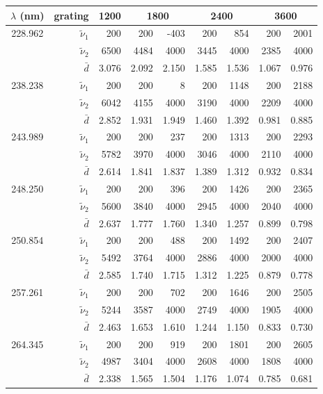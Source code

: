 \begin{tabular}{crrrrrrrr}
\toprule
$\lambda$ (nm)
	& grating & 1200 & \multicolumn{2}{c}{1800}
		& \multicolumn{2}{c}{2400} & \multicolumn{2}{c}{3600} \\
\midrule
\multirow{3}{*}{228.962}
	& $\tilde{\nu}_1$ &   200 &   200 &  -403 &   200 &   854 &   200 &  2001 \\
	& $\tilde{\nu}_2$ &  6500 &  4484 &  4000 &  3445 &  4000 &  2385 &  4000 \\
	& $\bar{d}$       & 3.076 & 2.092 & 2.150 & 1.585 & 1.536 & 1.067 & 0.976 \\
\midrule
\multirow{3}{*}{238.238}
	& $\tilde{\nu}_1$ &   200 &   200 &     8 &   200 &  1148 &   200 &  2188 \\
	& $\tilde{\nu}_2$ &  6042 &  4155 &  4000 &  3190 &  4000 &  2209 &  4000 \\
	& $\bar{d}$       & 2.852 & 1.931 & 1.949 & 1.460 & 1.392 & 0.981 & 0.885 \\
\midrule
\multirow{3}{*}{243.989}
	& $\tilde{\nu}_1$ &   200 &   200 &   237 &   200 &  1313 &   200 &  2293 \\
	& $\tilde{\nu}_2$ &  5782 &  3970 &  4000 &  3046 &  4000 &  2110 &  4000 \\
	& $\bar{d}$       & 2.614 & 1.841 & 1.837 & 1.389 & 1.312 & 0.932 & 0.834 \\
\midrule
\multirow{3}{*}{248.250}
	& $\tilde{\nu}_1$ &   200 &   200 &   396 &   200 &  1426 &   200 &  2365 \\
	& $\tilde{\nu}_2$ &  5600 &  3840 &  4000 &  2945 &  4000 &  2040 &  4000 \\
	& $\bar{d}$       & 2.637 & 1.777 & 1.760 & 1.340 & 1.257 & 0.899 & 0.798 \\
\midrule
\multirow{3}{*}{250.854}
	& $\tilde{\nu}_1$ &   200 &   200 &   488 &   200 &  1492 &   200 &  2407 \\
	& $\tilde{\nu}_2$ &  5492 &  3764 &  4000 &  2886 &  4000 &  2000 &  4000 \\
	& $\bar{d}$       & 2.585 & 1.740 & 1.715 & 1.312 & 1.225 & 0.879 & 0.778 \\
\midrule
\multirow{3}{*}{257.261}
	& $\tilde{\nu}_1$ &   200 &   200 &   702 &   200 &  1646 &   200 &  2505 \\
	& $\tilde{\nu}_2$ &  5244 &  3587 &  4000 &  2749 &  4000 &  1905 &  4000 \\
	& $\bar{d}$       & 2.463 & 1.653 & 1.610 & 1.244 & 1.150 & 0.833 & 0.730 \\
\midrule
\multirow{3}{*}{264.345}
	& $\tilde{\nu}_1$ &   200 &   200 &   919 &   200 &  1801 &   200 &  2605 \\
	& $\tilde{\nu}_2$ &  4987 &  3404 &  4000 &  2608 &  4000 &  1808 &  4000 \\
	& $\bar{d}$       & 2.338 & 1.565 & 1.504 & 1.176 & 1.074 & 0.785 & 0.681 \\
\bottomrule
\end{tabular}
